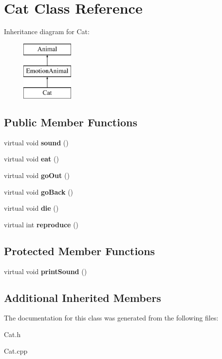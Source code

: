 \hypertarget{class_cat}{}\section{Cat Class Reference}
\label{class_cat}
Inheritance diagram for Cat\+:\begin{figure}[H]
\begin{center}
\leavevmode
\includegraphics[height=3.000000cm]{class_cat}
\end{center}
\end{figure}
\subsection*{Public Member Functions}
\begin{DoxyCompactItemize}
\item 
\mbox{\label{class_cat_a89af2e481b75462c468fb31b432779a4}} 
virtual void {\bfseries sound} ()
\item 
\mbox{\label{class_cat_a66ece6598afa3205ff6291323ff24964}} 
virtual void {\bfseries eat} ()
\item 
\mbox{\label{class_cat_a6cf8b6c4daf93d9e89cb5665b8df3937}} 
virtual void {\bfseries go\+Out} ()
\item 
\mbox{\label{class_cat_af75e2455e9f7f664d1f5dfd1ece285e7}} 
virtual void {\bfseries go\+Back} ()
\item 
\mbox{\label{class_cat_aed1c7db476cda98bddd8f649cb0a4fbf}} 
virtual void {\bfseries die} ()
\item 
\mbox{\label{class_cat_ae391b6b7c157fc4f64ed76ea1f4d1b89}} 
virtual int {\bfseries reproduce} ()
\end{DoxyCompactItemize}
\subsection*{Protected Member Functions}
\begin{DoxyCompactItemize}
\item 
\mbox{\label{class_cat_a47b3ccbb7f4d63f70ce0c45c3352d19a}} 
virtual void {\bfseries print\+Sound} ()
\end{DoxyCompactItemize}
\subsection*{Additional Inherited Members}


The documentation for this class was generated from the following files\+:\begin{DoxyCompactItemize}
\item 
Cat.\+h\item 
Cat.\+cpp\end{DoxyCompactItemize}
